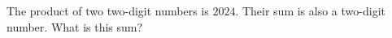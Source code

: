 The product of two two-digit numbers is $2024$. Their sum is also a two-digit number. What is this sum?
